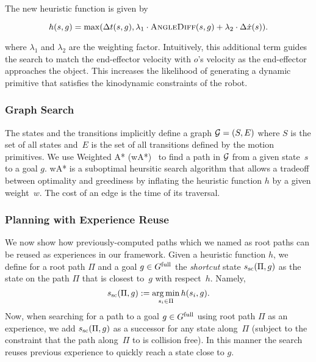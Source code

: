 \documentclass[a4paper]{report}
\begin{document}
The new heuristic function is given by


$$
 h(s,g) = \max (\Delta t(s,g),
 \lambda_1 \cdot \textsc{AngleDiff}(s,g) + \lambda_2 \cdot \Delta \dot{x}(s)).
 $$


where $\lambda_1$ and $\lambda_2$ are the weighting factor. Intuitively, this additional term guides the search to match the end-effector velocity with $o$'s velocity as the end-effector approaches the object. This increases the likelihood of generating a dynamic primitive that satisfies the kinodynamic constraints of the robot. 

\subsubsection{Graph Search}
The states and the transitions implicitly define a graph $\mathcal{G} = (S,E)$ where $S$ is the set of all states and~$E$ is the set of all transitions defined by the motion primitives. We use Weighted A* (wA*)~\cite{pohl1970heuristic} to find a path in $\mathcal{G}$ from a given state~$s$ to a goal $g$. 
wA* is a suboptimal heursitic search algorithm that allows a tradeoff between optimality and greediness by inflating the heuristic function $h$ by a given weight~$w$. The cost of an edge is the time of its traversal.

\subsubsection{Planning with Experience Reuse}
We now show how previously-computed paths which we named as root paths can be reused as experiences in our framework. Given a heuristic function $h$, we define for a root path $\Pi$ and a goal $g \in G^{\textrm{full}}$ the \emph{shortcut} state $s_{\textrm{sc}} (\Pi,g)$ as the state on the path $\Pi$ that is closest to~$g$ with respect~$h$.
Namely,
\begin{equation}
s_{\textrm{sc}} (\Pi,g) := \operatorname*{arg\,min}\limits_{s_i \in \Pi} h(s_i, g).
\end{equation}
Now, when searching for a path to a goal $g \in G^{\textrm{full}}$ using root path $\Pi$ as an experience, we add $s_{\textrm{sc}} (\Pi,g)$ as a successor for any state along~$\Pi$
(subject to the constraint that the path along~$\Pi$ to \Ssc is collision free). In this manner the search reuses previous experience to quickly reach a state close to $g$.
\end{document}
